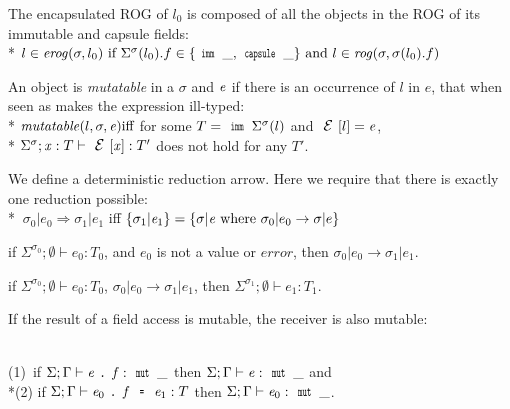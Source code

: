 The encapsulated ROG of $l_0$ is composed of all the objects
in the ROG of its immutable and capsule fields:\\*
\indent $l \in \mathit{erog}(\sigma,l_0)
\text{ if } \Sigma^\sigma(l_0).f \in \{\Kw{imm}\,\_,\Kw{capsule}\,\_\}
\text{ and } l \in \mathit{rog}(\sigma,\sigma(l_0).f)
$\loseSpace

\noindent An object is \emph{mutatable} in a $\sigma$ and  ${\mathit{e}}$ if there is an occurrence of 
$l$ in $e$, that when seen as \Q@imm@ makes the expression ill-typed:\\*
$\mathit{mutatable}(l,\sigma,\e) \text{iff}$ for some $T=\Kw{imm}\,\Sigma^\sigma(l)$ and $\ctx[l]=\e$,\\*
\indent $\Sigma^\sigma;\x:T\vdash\ctx[\x]:T'$ does not hold for any $T'$.\loseSpace

\noindent We define
a deterministic reduction arrow.
Here we require that there is exactly one reduction possible:\\*
\indent$\ \sigma_0|e_0\Rightarrow \sigma_1|e_1$ iff $\{\sigma_1|\e_1\}=\{\sigma|\e \text{ where } \sigma_0|e_0\rightarrow \sigma|e\}$ 



\begin{Assumption}[Progress]
if $\Sigma^{\sigma_0};\emptyset\vdash e_0: T_0$,
and $e_0$ is not a value or $\mathit{error}$, then
$\sigma_0|e_0\rightarrow \sigma_1|e_1$.
\end{Assumption}


\begin{Assumption}
if $\Sigma^{\sigma_0};\emptyset\vdash e_0: T_0$,
$\sigma_0|e_0\rightarrow \sigma_1|e_1$,
then
$\Sigma^{\sigma_1};\emptyset\vdash e_1: T_1$.
\end{Assumption}


\noindent If the result of a field access is mutable,
the receiver is also mutable:\saveSpace\saveSpace
\begin{Assumption}
\ \\
\indent(1)\ if $\Sigma;\Gamma\vdash\e\singleDot\f:\Kw{mut}\,\_$
then $\Sigma;\Gamma\vdash\e:\Kw{mut}\,\_$
 and 
\\*\indent(2)
if $\Sigma;\Gamma\vdash\e_0\singleDot\f\equals\e_1:T$
then $\Sigma;\Gamma\vdash\e_0:\Kw{mut}\,\_$.
\end{Assumption}

